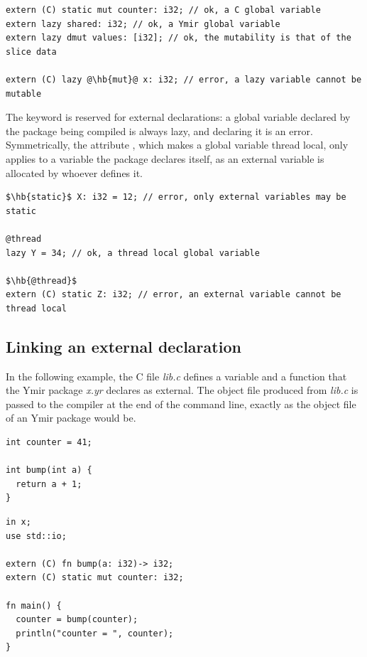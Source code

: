 \begin{lstlisting}[style=coloredverbatimError, escapechar=@]
extern (C) static mut counter: i32; // ok, a C global variable
extern lazy shared: i32; // ok, a Ymir global variable
extern lazy dmut values: [i32]; // ok, the mutability is that of the slice data

extern (C) lazy @\hb{mut}@ x: i32; // error, a lazy variable cannot be mutable
\end{lstlisting}

The keyword  is reserved for external declarations: a global
variable declared by the package being compiled is always lazy, and declaring it
 is an error. Symmetrically, the attribute , which
makes a global variable thread local, only applies to a variable the package
declares itself, as an external variable is allocated by whoever defines it.

\begin{lstlisting}[style=coloredverbatimError, escapechar=$]
$\hb{static}$ X: i32 = 12; // error, only external variables may be static

@thread
lazy Y = 34; // ok, a thread local global variable

$\hb{@thread}$
extern (C) static Z: i32; // error, an external variable cannot be thread local
\end{lstlisting}

\subsection{Linking an external declaration}

In the following example, the C file \textit{lib.c} defines a variable and a
function that the Ymir package \textit{x.yr} declares as external. The object
file produced from \textit{lib.c} is passed to the compiler at the end of the
command line, exactly as the object file of an Ymir package would be.

\begin{minipage}[t][][t]{0.35\linewidth}
\begin{lstlisting}[caption=\textit{lib.c}, style=cVerb]
int counter = 41;

int bump(int a) {
  return a + 1;
}
\end{lstlisting}
\end{minipage}\hspace{5pt}%
\begin{minipage}[t][][t]{0.6\linewidth}
\begin{lstlisting}[caption=\textit{x.yr}, style=coloredverbatim]
in x;
use std::io;

extern (C) fn bump(a: i32)-> i32;
extern (C) static mut counter: i32;

fn main() {
  counter = bump(counter);
  println("counter = ", counter);
}
\end{lstlisting}
\end{minipage}

